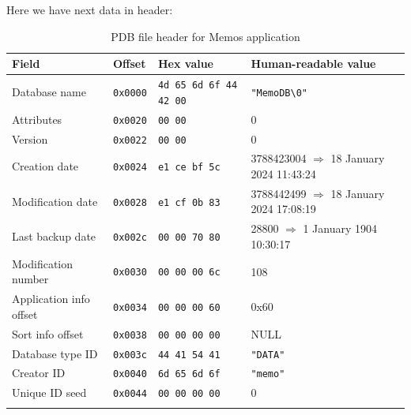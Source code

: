 \documentclass[a4paper,12pt,oneside]{scrartcl}
\begin{document}
Here we have next data in header:
\begin{longtable}{|p{3cm}|l|l|p{5cm}|}
  \hline
  \textbf{Field} & \textbf{Offset} & \textbf{Hex value} & \textbf{Human-readable value} \\
  \hline
  Database name & \texttt{0x0000} & \texttt{4d 65 6d 6f 44 42 00} & \texttt{"MemoDB\textbackslash{}0"} \\
  \hline
  Attributes & \texttt{0x0020} & \texttt{00 00} & 0 \\
  \hline
  Version & \texttt{0x0022} & \texttt{00 00} & 0 \\
  \hline
  Creation date & \texttt{0x0024} & \texttt{e1 ce bf 5c} & 3788423004 $\Rightarrow$ 18 January 2024 11:43:24 \\
  \hline
  Modification date & \texttt{0x0028} & \texttt{e1 cf 0b 83} & 3788442499 $\Rightarrow$ 18 January 2024 17:08:19 \\
  \hline
  Last backup date & \texttt{0x002c} & \texttt{00 00 70 80} & 28800 $\Rightarrow$ 1 January 1904 10:30:17 \\
  \hline
  Modification number & \texttt{0x0030} & \texttt{00 00 00 6c} & 108 \\
  \hline
  Application info offset & \texttt{0x0034} & \texttt{00 00 00 60} & 0x60 \\
  \hline
  Sort info offset & \texttt{0x0038} & \texttt{00 00 00 00} & NULL \\
  \hline
  Database type ID & \texttt{0x003c} & \texttt{44 41 54 41} & \texttt{"DATA"} \\
  \hline
  Creator ID & \texttt{0x0040} & \texttt{6d 65 6d 6f} & \texttt{"memo"} \\
  \hline
  Unique ID seed & \texttt{0x0044} & \texttt{00 00 00 00} & 0 \\
  \hline
  \caption{PDB file header for Memos application}
  \label{tab:memos-header}
\end{longtable}
\end{document}
